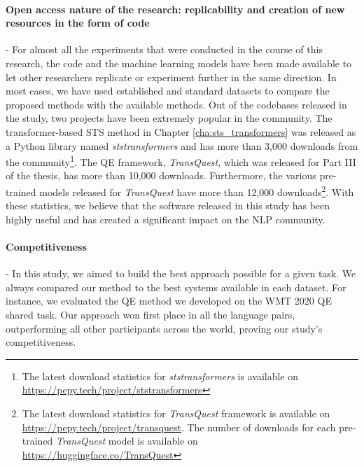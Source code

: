 \paragraph{Open access nature of the research: replicability and creation of new resources in the form of code} - For almost all the experiments that were conducted in the course of this research, the code and the machine learning models have been made available to let other researchers replicate or experiment further in the same direction. In most cases, we have used established and standard datasets to compare the proposed methods with the available methods. Out of the codebases released in the study, two projects have been extremely popular in the community. The transformer-based STS method in Chapter \ref{cha:sts_transformers} was released as a Python library named \textit{ststransformers} and has more than 3,000 downloads from the community\footnote{The latest download statistics for \textit{ststransformers} is available on \url{https://pepy.tech/project/ststransformers}}. The QE framework, \textit{TransQuest}, which was released for Part III of the thesis, has more than 10,000 downloads. Furthermore, the various pre-trained models released for \textit{TransQuest} have more than 12,000 downloads\footnote{The latest download statistics for \textit{TransQuest} framework is available on \url{https://pepy.tech/project/transquest}. The number of downloads for each pre-trained \textit{TransQuest} model is available on \url{https://huggingface.co/TransQuest}}. With these statistics, we believe that the software released in this study has been highly useful and has created a significant impact on the NLP community.

\paragraph{Competitiveness} - In this study, we aimed to build the best approach possible for a given task. We always compared our method to the best systems available in each dataset. For instance, we evaluated the QE method we developed on the WMT 2020 QE shared task. Our approach won first place in all the language pairs, outperforming all other participants across the world, proving our study's competitiveness.



